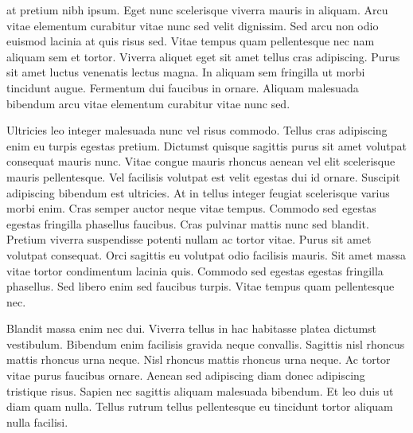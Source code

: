\begin{acknowledgements}
at pretium nibh ipsum. Eget nunc scelerisque viverra mauris in aliquam. Arcu vitae elementum curabitur vitae nunc sed velit dignissim. Sed arcu non odio euismod lacinia at quis risus sed. Vitae tempus quam pellentesque nec nam aliquam sem et tortor. Viverra aliquet eget sit amet tellus cras adipiscing. Purus sit amet luctus venenatis lectus magna. In aliquam sem fringilla ut morbi tincidunt augue. Fermentum dui faucibus in ornare. Aliquam malesuada bibendum arcu vitae elementum curabitur vitae nunc sed.

Ultricies leo integer malesuada nunc vel risus commodo. Tellus cras adipiscing enim eu turpis egestas pretium. Dictumst quisque sagittis purus sit amet volutpat consequat mauris nunc. Vitae congue mauris rhoncus aenean vel elit scelerisque mauris pellentesque. Vel facilisis volutpat est velit egestas dui id ornare. Suscipit adipiscing bibendum est ultricies. At in tellus integer feugiat scelerisque varius morbi enim. Cras semper auctor neque vitae tempus. Commodo sed egestas egestas fringilla phasellus faucibus. Cras pulvinar mattis nunc sed blandit. Pretium viverra suspendisse potenti nullam ac tortor vitae. Purus sit amet volutpat consequat. Orci sagittis eu volutpat odio facilisis mauris. Sit amet massa vitae tortor condimentum lacinia quis. Commodo sed egestas egestas fringilla phasellus. Sed libero enim sed faucibus turpis. Vitae tempus quam pellentesque nec.

Blandit massa enim nec dui. Viverra tellus in hac habitasse platea dictumst vestibulum. Bibendum enim facilisis gravida neque convallis. Sagittis nisl rhoncus mattis rhoncus urna neque. Nisl rhoncus mattis rhoncus urna neque. Ac tortor vitae purus faucibus ornare. Aenean sed adipiscing diam donec adipiscing tristique risus. Sapien nec sagittis aliquam malesuada bibendum. Et leo duis ut diam quam nulla. Tellus rutrum tellus pellentesque eu tincidunt tortor aliquam nulla facilisi.

\end{acknowledgements}

\tableofcontents

